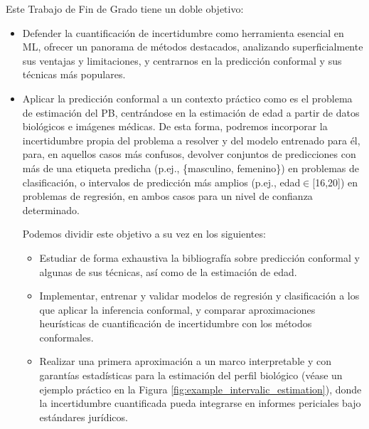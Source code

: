Este Trabajo de Fin de Grado tiene un doble objetivo: 

\begin{itemize}

    \item Defender la cuantificación de incertidumbre como herramienta esencial en \acrshort{ML}, ofrecer un panorama de métodos destacados, analizando superficialmente sus ventajas y limitaciones, y centrarnos en la predicción conformal y sus técnicas más populares.

    \item Aplicar la predicción conformal a un contexto práctico como es el problema de estimación del \acrshort{PB}, centrándose en la estimación de edad a partir de datos biológicos e imágenes médicas. De esta forma, podremos incorporar la incertidumbre propia del problema a resolver y del modelo entrenado para él, para, en aquellos casos más confusos, devolver conjuntos de predicciones con más de una etiqueta predicha (p.ej., \{masculino, femenino\}) en problemas de clasificación, o intervalos de predicción más amplios (p.ej., edad$\in$[16,20]) en problemas de regresión, en ambos casos para un nivel de confianza determinado.
    
    Podemos dividir este objetivo a su vez en los siguientes:

    \begin{itemize}

        \item Estudiar de forma exhaustiva la bibliografía sobre predicción conformal y algunas de sus técnicas, así como de la estimación de edad.

        \item Implementar, entrenar y validar modelos de regresión y clasificación a los que aplicar la inferencia conformal, y comparar aproximaciones heurísticas de cuantificación de incertidumbre con los métodos conformales.

        \item Realizar una primera aproximación a un marco interpretable y con garantías estadísticas para la estimación del perfil biológico (véase un ejemplo práctico en la Figura \ref{fig:example_intervalic_estimation}), donde la incertidumbre cuantificada pueda integrarse en informes periciales bajo estándares jurídicos.

    \end{itemize}

\end{itemize}

